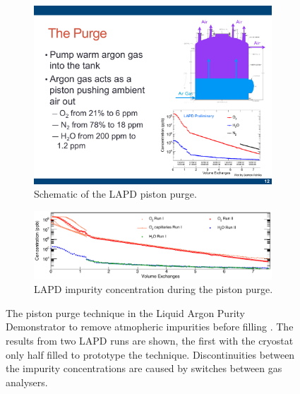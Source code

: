 \newsavebox{\largestimage}

\begin{figure}
  \centering
  \begin{subfigure}[t]{0.5\linewidth}
    \centering
    \includegraphics[width=0.98\textwidth]{LAPDPistonPurgeSchematic.pdf}
    \caption{Schematic of the LAPD piston purge.}
    \label{fig:LAPDPistonPurgeSchematic}
  \end{subfigure}\vspace{5mm}
  \begin{subfigure}[t]{0.7\linewidth}
    \centering
    \includegraphics[width=0.98\textwidth]{LAPDPistonPurgeImpurities.pdf}
    \caption{LAPD impurity concentration during the piston purge.}
    \label{fig:LAPDPistonPurgeImpurities}
  \end{subfigure}
  \caption[The piston purge technique in the Liquid Argon Purity Demonstrator to remove atmopheric impurities before filling.]{The piston purge technique in the Liquid Argon Purity Demonstrator to remove atmopheric impurities before filling \cite{LAPDJINST2014}.  The results from two LAPD runs are shown, the first with the cryostat only half filled to prototype the technique.  Discontinuities between the impurity concentrations are caused by switches between gas analysers.}
  \label{fig:LAPDPistonPurge}
\end{figure}

